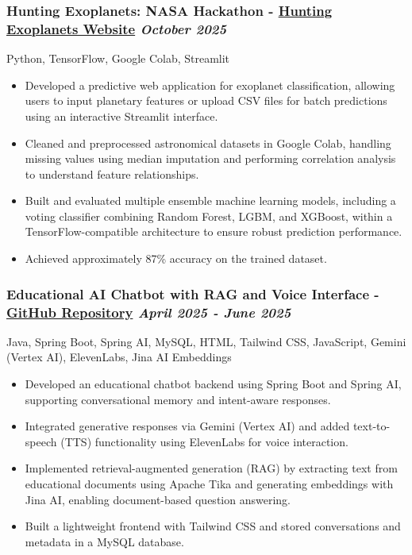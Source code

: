 \documentclass[a4paper,10pt]{article}
\begin{document}
\subsubsection*{%
  \textbf{Hunting Exoplanets: NASA Hackathon} - \href{https://exoplanet-app-730407208895.us-central1.run.app/}{Hunting Exoplanets Website}
  \hfill
  \textit{October 2025}
}
Python, TensorFlow, Google Colab, Streamlit
\begin{itemize}
  \item Developed a predictive web application for exoplanet classification,
         allowing users to input planetary features or upload CSV files for batch 
         predictions using an interactive Streamlit interface.
  \item Cleaned and preprocessed astronomical datasets in Google Colab, handling missing 
        values using median imputation and performing correlation analysis to understand 
        feature relationships.
  \item Built and evaluated multiple ensemble machine learning models, including a voting classifier combining Random Forest, LGBM, and XGBoost, within a
        TensorFlow-compatible architecture to ensure robust prediction performance.
  \item Achieved approximately 87\% accuracy on the trained dataset.
      
\end{itemize}
\subsubsection*{%
  \textbf{Educational AI Chatbot with RAG and Voice Interface} - \href{https://github.com/RonaldDavidMartinezMarenco/Mini-Chatbot}{GitHub Repository}
  \hfill
  \textit{April 2025 - June 2025}
}
Java, Spring Boot, Spring AI, MySQL, HTML, Tailwind CSS, JavaScript, Gemini (Vertex AI), ElevenLabs, Jina AI Embeddings
\begin{itemize}
  \item Developed an educational chatbot backend using Spring Boot and Spring AI, 
        supporting conversational memory and intent-aware responses.
  \item Integrated generative responses via Gemini (Vertex AI) and added text-to-speech (TTS)
        functionality using ElevenLabs for voice interaction.
  \item Implemented retrieval-augmented generation (RAG) by extracting text from educational
        documents using Apache Tika and generating embeddings with Jina AI, enabling document-based 
        question answering.
  \item Built a lightweight frontend with Tailwind CSS and stored conversations and metadata in a
        MySQL database.
\end{itemize}
\end{document}
